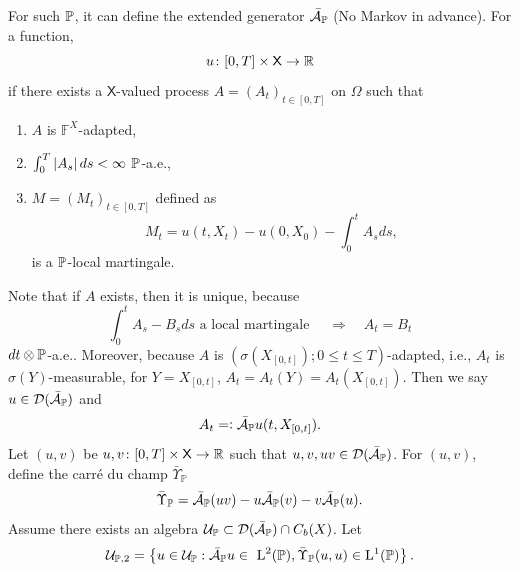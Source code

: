 For such $\mathbb{P}$, it can define the extended generator $\bar{\mathcal{A}}_{\mathbb{P}}$ (No Markov in advance). For a function,
\begin{equation*}
    u \colon [0,T] \times \mathsf{X} \rightarrow \mathbb{R}
\end{equation*}
if there exists a $\mathsf{X}$-valued process $A = (A_t)_{t \in[0,T]}$ on $\Omega$ such that
\begin{enumerate}[label=(\alph{*})]
    \item $A$ is $\mathbb{F}^X$-adapted,
    \item $\int_0^T \left\lvert A_s\right\lvert ds < \infty$ $\mathbb{P}$-a.e.,
    \item $M = (M_t)_{t \in [0,T]}$ defined as
    \begin{equation*}
        M_t = u(t,X_t) - u(0,X_0) - \int_0^tA_sds,
    \end{equation*}
    is a $\mathbb{P}$-local martingale.
\end{enumerate}
Note that if $A$ exists, then it is unique, because
\begin{equation*}
    \int_0^t A_s - B_s ds \text{ a local martingale }\quad \Rightarrow \quad A_t = B_t
\end{equation*}
$dt \otimes \mathbb{P}$-a.e.. Moreover, because $A$ is $\left(\sigma\left(X_{[0, t]}\right) ; 0 \leq t \leq T\right)$-adapted, i.e., $A_t$ is $\sigma(Y)$-measurable, for $Y = X_{[0,t]}$, $A_t = A_t(Y) = A_t(X_{[0,t]})$. Then we say $u \in \mathcal{D}(\bar{\mathcal{A}}_{\mathbb{P}})$ and 
\begin{equation*}
    A_t =\vcentcolon \bar{\mathcal{A}}_{\mathbb{P}} u(t, X_{[0,t]}).
\end{equation*}
Let $(u,v)$ be $u,v \colon [0,T] \times \mathsf{X} \rightarrow \mathbb{R}$ such that $u,v,uv \in \mathcal{D}(\bar{\mathcal{A}}_{\mathbb{P}})$. For $(u,v)$, define the carr\'e du champ $\bar{\Upsilon}_{\mathbb{P}}$
\begin{equation*}
    \bar{\Upsilon}_{\mathbb{P}} = \bar{\mathcal{A}}_{\mathbb{P}}(uv) - u\bar{\mathcal{A}}_{\mathbb{P}}(v) - v\bar{\mathcal{A}}_{\mathbb{P}}(u).
\end{equation*}
Assume there exists an algebra $\mathcal{U}_{\mathbb{P}} \subset \mathcal{D}(\bar{\mathcal{A}}_{\mathbb{P}}) \cap C_b(X)$. Let
\begin{equation*}
    \mathcal{U}_{\mathbb{P}, 2}=\left\{u \in \mathcal{U}_{\mathbb{P}}: \bar{\mathcal{A}}_{\mathbb{P}} u \in \mathrm{~L}^2(\mathbb{P}), \bar{\Upsilon}_{\mathbb{P}}(u, u) \in \mathrm{L}^1(\mathbb{P})\right\} .
\end{equation*}

